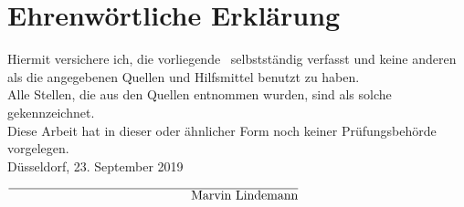 
\chapter{Ehrenw\"ortliche Erkl\"arung}

Hiermit versichere ich, die vorliegende \Typ \ selbstst\"andig verfasst und keine anderen als die angegebenen Quellen und Hilfsmittel benutzt zu haben.\\

\noindent Alle Stellen, die aus den Quellen entnommen wurden, sind als solche gekennzeichnet.\\

\noindent Diese Arbeit hat in dieser oder \"ahnlicher Form noch keiner Pr\"ufungsbeh\"orde vorgelegen. \\

\vspace{8cm}
\noindent D\"usseldorf, 23. September 2019%
\begin{flushright}
$\overline{\text{~~~~~~~~~~~~~~~~~~~~~~~~~~~~~~~~~~~~~~~~~~~Marvin Lindemann}}$
\end{flushright}